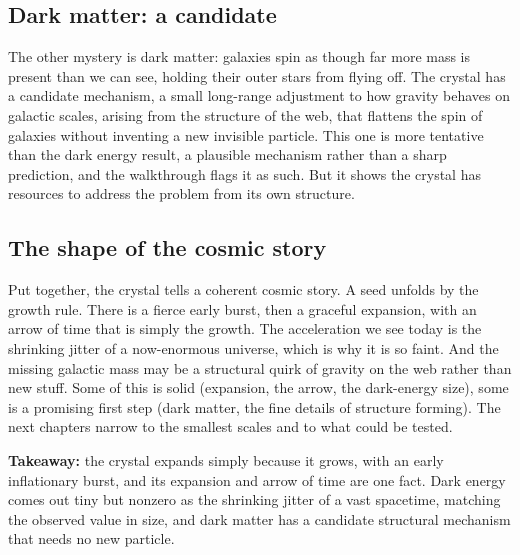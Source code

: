\subsection{Dark matter: a candidate}

The other mystery is dark matter: galaxies spin as though far more mass is present than we can see, holding their outer stars from flying off. The crystal has a candidate mechanism, a small long-range adjustment to how gravity behaves on galactic scales, arising from the structure of the web, that flattens the spin of galaxies without inventing a new invisible particle. This one is more tentative than the dark energy result, a plausible mechanism rather than a sharp prediction, and the walkthrough flags it as such. But it shows the crystal has resources to address the problem from its own structure.

\subsection{The shape of the cosmic story}

Put together, the crystal tells a coherent cosmic story. A seed unfolds by the growth rule. There is a fierce early burst, then a graceful expansion, with an arrow of time that is simply the growth. The acceleration we see today is the shrinking jitter of a now-enormous universe, which is why it is so faint. And the missing galactic mass may be a structural quirk of gravity on the web rather than new stuff. Some of this is solid (expansion, the arrow, the dark-energy size), some is a promising first step (dark matter, the fine details of structure forming). The next chapters narrow to the smallest scales and to what could be tested.

\textbf{Takeaway:} the crystal expands simply because it grows, with an early inflationary burst, and its expansion and arrow of time are one fact. Dark energy comes out tiny but nonzero as the shrinking jitter of a vast spacetime, matching the observed value in size, and dark matter has a candidate structural mechanism that needs no new particle.
